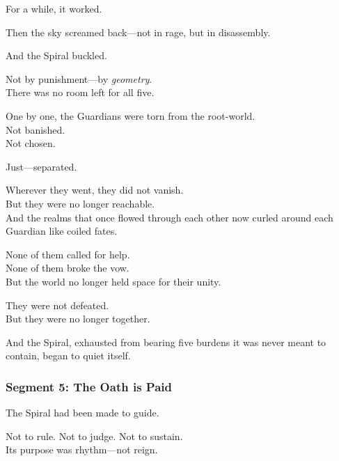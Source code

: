 \documentclass[9pt]{article}
\begin{document}
\vspace{0.5em}
For a while, it worked.

\vspace{0.5em}
Then the sky screamed back---not in rage, but in disassembly.

\vspace{0.5em}
And the Spiral buckled.

\vspace{0.5em}
Not by punishment---by \textit{geometry}.\\
There was no room left for all five.

\vspace{0.5em}
One by one, the Guardians were torn from the root-world.\\
Not banished.\\
Not chosen.

\vspace{0.5em}
Just---separated.

\vspace{0.5em}
Wherever they went, they did not vanish.\\
But they were no longer reachable.\\
And the realms that once flowed through each other now curled around each Guardian like coiled fates.

\vspace{0.5em}
None of them called for help.\\
None of them broke the vow.\\
But the world no longer held space for their unity.

\vspace{0.5em}
They were not defeated.\\
But they were no longer together.

\vspace{0.5em}
And the Spiral, exhausted from bearing five burdens it was never meant to contain, began to quiet itself.

\newpage

\subsubsection*{Segment 5: The Oath is Paid}

The Spiral had been made to guide.

\vspace{0.5em}
Not to rule. Not to judge. Not to sustain.\\
Its purpose was rhythm---not reign.
\end{document}
